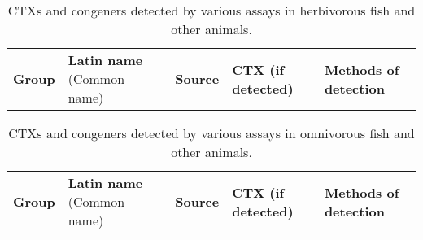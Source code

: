 \documentclass[12pt]{article}
\begin{document}



\FloatBarrier
\begin{table}
\caption{CTXs and congeners detected by various assays in herbivorous fish and other animals.}
\label{tbl:HerbTable}
\begin{tabular}{ p{2cm} p{3cm}  p{4.5cm}  p{2cm}  p{3cm}  }
\textbf{Group} & \textbf{Latin name} (Common name) & \textbf{Source} & \textbf{CTX (if detected)} & \textbf{Methods of detection} \\
\end{tabular}
\end{table}
\FloatBarrier
\begin{table}
\caption{CTXs and congeners detected by various assays in omnivorous fish and other animals.}
\label{tbl:OmniTable}
\begin{tabular}{ p{2cm} p{3cm}  p{4.5cm}  p{2cm}  p{3cm}  }
\textbf{Group} & \textbf{Latin name} (Common name) & \textbf{Source} & \textbf{CTX (if detected)} & \textbf{Methods of detection} \\
\end{tabular}
\end{table}
\end{document}
